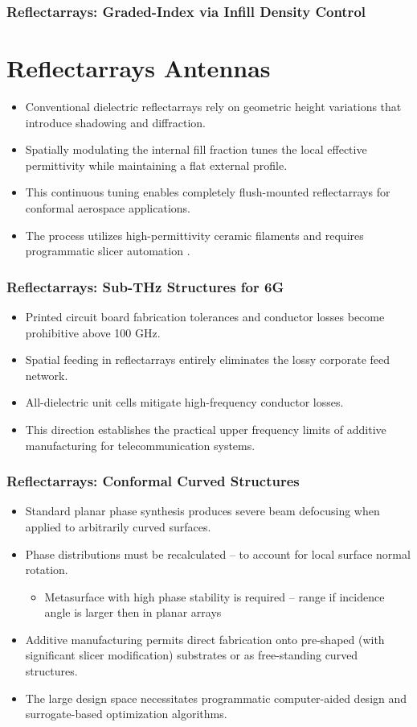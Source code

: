 \documentclass[aspectratio=43]{beamer}
\begin{document}
\begin{frame}[fragile]
  \frametitle{Reflectarrays: Graded-Index via Infill Density Control}
	\section{Reflectarrays Antennas}
  \begin{itemize}
    \item Conventional dielectric reflectarrays rely on geometric height variations that introduce shadowing and diffraction.
    \item Spatially modulating the internal fill fraction tunes the local effective permittivity while maintaining a flat external profile.
    \item This continuous tuning enables completely flush-mounted reflectarrays for conformal aerospace applications.
    \item The process utilizes high-permittivity ceramic filaments and requires programmatic slicer automation .
  \end{itemize}
\end{frame}

\begin{frame}[fragile]
  \frametitle{Reflectarrays: Sub-THz Structures for 6G}
  \begin{itemize}
    \item Printed circuit board fabrication tolerances and conductor losses become prohibitive above 100 GHz.
    \item Spatial feeding in reflectarrays entirely eliminates the lossy corporate feed network.
    \item All-dielectric unit cells mitigate high-frequency conductor losses.
    \item This direction establishes the practical upper frequency limits of additive manufacturing for telecommunication systems.
  \end{itemize}
\end{frame}

\begin{frame}[fragile]
  \frametitle{Reflectarrays: Conformal Curved Structures}
  \begin{itemize}
    \item Standard planar phase synthesis produces severe beam defocusing when applied to arbitrarily curved surfaces.
    \item Phase distributions must be recalculated -- to account for local surface normal rotation.
			\begin{itemize}
				\item Metasurface with high phase stability is required -- range if incidence angle is larger then in planar arrays
			\end{itemize}
		\item Additive manufacturing permits direct fabrication onto pre-shaped (with significant slicer modification) substrates or as free-standing curved structures.
    \item The large design space necessitates programmatic computer-aided design and surrogate-based optimization algorithms.
  \end{itemize}
\end{frame}
\end{document}
